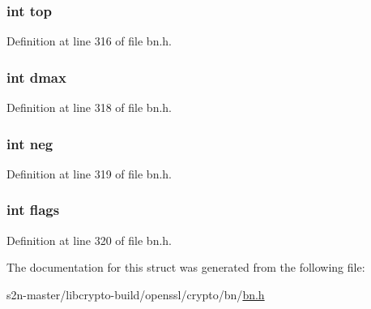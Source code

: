 \subsubsection[{\texorpdfstring{top}{top}}]{\setlength{\rightskip}{0pt plus 5cm}int top}\hypertarget{structbignum__st_af93f4f37fc2ad9c37af4a715423b110c}{}\label{structbignum__st_af93f4f37fc2ad9c37af4a715423b110c}


Definition at line 316 of file bn.\+h.

\subsubsection[{\texorpdfstring{dmax}{dmax}}]{\setlength{\rightskip}{0pt plus 5cm}int dmax}\hypertarget{structbignum__st_a3957bf07e2d7a09bae62601592079d3d}{}\label{structbignum__st_a3957bf07e2d7a09bae62601592079d3d}


Definition at line 318 of file bn.\+h.

\subsubsection[{\texorpdfstring{neg}{neg}}]{\setlength{\rightskip}{0pt plus 5cm}int neg}\hypertarget{structbignum__st_a186b6342d483ea691785eb9a6d88605b}{}\label{structbignum__st_a186b6342d483ea691785eb9a6d88605b}


Definition at line 319 of file bn.\+h.

\subsubsection[{\texorpdfstring{flags}{flags}}]{\setlength{\rightskip}{0pt plus 5cm}int flags}\hypertarget{structbignum__st_ac8bf36fe0577cba66bccda3a6f7e80a4}{}\label{structbignum__st_ac8bf36fe0577cba66bccda3a6f7e80a4}


Definition at line 320 of file bn.\+h.



The documentation for this struct was generated from the following file\+:\begin{DoxyCompactItemize}
\item 
s2n-\/master/libcrypto-\/build/openssl/crypto/bn/\hyperlink{crypto_2bn_2bn_8h}{bn.\+h}\end{DoxyCompactItemize}
